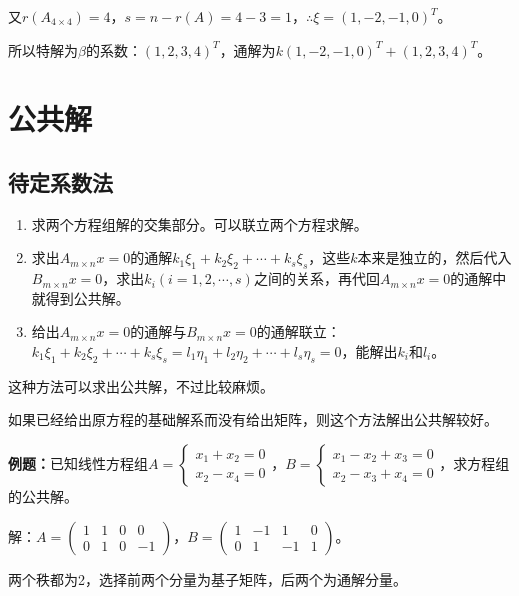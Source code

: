 又$r(A_{4\times4})=4$，$s=n-r(A)=4-3=1$，$\therefore\xi=(1,-2,-1,0)^T$。

所以特解为$\beta$的系数：$(1,2,3,4)^T$，通解为$k(1,-2,-1,0)^T+(1,2,3,4)^T$。

\section{公共解}

\subsection{待定系数法}

\begin{enumerate}
    \item 求两个方程组解的交集部分。可以联立两个方程求解。
    \item 求出$A_{m\times n}x=0$的通解$k_1\xi_1+k_2\xi_2+\cdots+k_s\xi_s$，这些$k$本来是独立的，然后代入$B_{m\times n}x=0$，求出$k_i(i=1,2,\cdots,s)$之间的关系，再代回$A_{m\times n}x=0$的通解中就得到公共解。
    \item 给出$A_{m\times n}x=0$的通解与$B_{m\times n}x=0$的通解联立：$k_1\xi_1+k_2\xi_2+\cdots+k_s\xi_s=l_1\eta_1+l_2\eta_2+\cdots+l_s\eta_s=0$，能解出$k_i$和$l_i$。
\end{enumerate}

这种方法可以求出公共解，不过比较麻烦。

如果已经给出原方程的基础解系而没有给出矩阵，则这个方法解出公共解较好。

\textbf{例题：}已知线性方程组$A=\left\{\begin{array}{l}
    x_1+x_2=0 \\
    x_2-x_4=0
\end{array}\right.$，$B=\left\{\begin{array}{l}
    x_1-x_2+x_3=0 \\
    x_2-x_3+x_4=0
\end{array}\right.$，求方程组的公共解。

解：$A=\left(\begin{array}{cccc}
    1 & 1 & 0 & 0 \\
    0 & 1 & 0 & -1
\end{array}\right)$，$B=\left(\begin{array}{cccc}
    1 & -1 & 1 & 0 \\
    0 & 1 & -1 & 1
\end{array}\right)$。\medskip

两个秩都为2，选择前两个分量为基子矩阵，后两个为通解分量。

